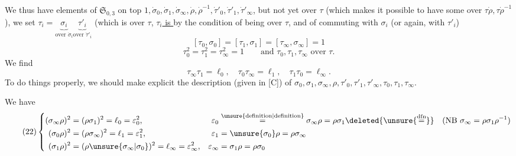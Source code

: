 
We thus have elements of $\mathfrak S_{0,3}$ on top 
$1,\dot\sigma_0,\dot\sigma_1,\dot\sigma_\infty,\dot\rho,\dot\rho^{-1},\dot\tau'_0,\dot\tau'_1,\dot\tau'_\infty$,
but not yet over $\tau$ (which makes it possible to have some over $\tau\dot\rho,\tau\dot\rho^{-1}$),
we set
$\tau_i=\underbrace{\sigma_i}_{\text{over }\dot\sigma_i}\underbrace{\tau'_i}_{\text{over }\dot\tau'_i}$
(which is over $\tau$, 
\uline{$\tau_i$ is } 
by the condition of being over $\tau$,  and of commuting with $\sigma_i$ (or again, with $\tau'_i$)
\[
\tag{19}
[\tau_0,\sigma_0]=[\tau_1,\sigma_1]=[\tau_\infty,\sigma_\infty]=1
\]
\[
\tag{20}
\tau_0^2=\tau_1^2=\tau_\infty^2=1
\qquad\text{and }\tau_0,\tau_1,\tau_\infty\text{ over }\tau.
\]
We find
\[
\tag{21}
\tau_\infty\tau_1=\ell_0,\quad\tau_0\tau_\infty=\ell_1,\quad\tau_1\tau_0=\ell_\infty.
\]
To do things properly, we should make explicit the  description (given in [C]) of
$\sigma_0,\sigma_1,\sigma_\infty,\rho,\tau'_0,\tau'_1,\tau'_\infty,\tau_0,\tau_1,\tau_\infty$.



We have
\[
\tag{22}
\left\{\begin{aligned}
(\sigma_\infty\rho)^2&=(\rho\sigma_1)^2=\ell_0=\varepsilon_0^2,&
\varepsilon_0&\overset{\unsure{\text{definition}|\text{definition}}}{=}\sigma_\infty\rho=\rho\sigma_1\deleted{\unsure{\overset{\mathrm{dfn}}{=}}}
\quad(\mathrm{NB}\ \sigma_\infty=\rho\sigma_1\rho^{-1})\\
(\sigma_0\rho)^2&=(\rho\sigma_\infty)^2=\ell_1=\varepsilon_1^2,&
\varepsilon_1&=\unsure{\sigma_0}\rho=\rho\sigma_\infty\\
(\sigma_1\rho)^2&=(\rho\unsure{\sigma_\infty|\sigma_0})^2=\ell_\infty=\varepsilon_\infty^2,&
\varepsilon_\infty&=\sigma_1\rho=\rho\sigma_0
\end{aligned}\right.
\]

